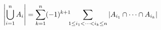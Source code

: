 \documentclass[preview]{standalone}
\begin{document}
\begin{align*}
\special{dvisvgm:raw <g id='unique000'>}\left|\bigcup_{i=1}^{n} A_i\right|= \sum_{k=1}^{n} (-1)^{k+1}\!\!\!\sum_{1 \le i_1 < \cdots < i_k \le n}\left|A_{i_1} \cap \cdots \cap A_{i_k}\right|\special{dvisvgm:raw </g>}
\end{align*}
\end{document}

